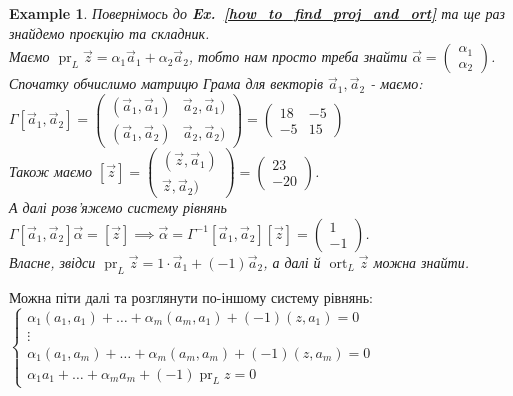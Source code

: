 \documentclass[a4paper, 10pt]{article}
\theoremstyle{theoremdd}
\newtheorem{example}[theorem]{Example}
\newcommand\exref[1]{\textbf{Ex.~\ref{#1}}}
\DeclareMathOperator{\ort}{ort}
\DeclareMathOperator{\pr}{pr}
\begin{document}
\begin{example}
Повернімось до \exref{how_to_find_proj_and_ort} та ще раз знайдемо проєкцію та складник.\\
Маємо $\pr_L \vec{z} = \alpha_1 \vec{a}_1 + \alpha_2 \vec{a}_2$, тобто нам просто треба знайти $\vec{\alpha} = \begin{pmatrix}
\alpha_1 \\ \alpha_2
\end{pmatrix}$.\\
Спочатку обчислимо матрицю Грама для векторів $\vec{a}_1,\vec{a}_2$ - маємо:\\
$\Gamma[\vec{a}_1,\vec{a}_2] = \begin{pmatrix}
(\vec{a}_1,\vec{a}_1) & \vec{a}_2, \vec{a}_1) \\
(\vec{a}_1,\vec{a}_2) & \vec{a}_2, \vec{a}_2) 
\end{pmatrix} = \begin{pmatrix}
18 & -5 \\
-5 & 15
\end{pmatrix}$\\
Також маємо $[\vec{z}] = \begin{pmatrix}
(\vec{z},\vec{a}_1) \\
\vec{z},\vec{a}_2)
\end{pmatrix} = \begin{pmatrix}
23 \\ -20
\end{pmatrix}$.\\
А далі розв'яжемо систему рівнянь $\Gamma[\vec{a}_1,\vec{a}_2] \vec{\alpha} = [\vec{z}] \implies \vec{\alpha} = \Gamma^{-1}[\vec{a}_1,\vec{a}_2] [\vec{z}] = \begin{pmatrix}
1 \\ -1
\end{pmatrix}$.\\
Власне, звідси $\pr_L \vec{z} = 1 \cdot \vec{a}_1 + (-1) \vec{a}_2$, а далі й $\ort_L \vec{z}$ можна знайти.
\end{example}
\noindent
Можна піти далі та розглянути по-іншому систему рівнянь:\\
$\begin{cases}
\alpha_1 (a_1,a_1) + \dots + \alpha_m (a_m,a_1) + (-1) (z,a_1) = 0 \\
\vdots \\
\alpha_1 (a_1,a_m) + \dots + \alpha_m (a_m,a_m) + (-1) (z,a_m) = 0 \\
\alpha_1 a_1 + \dots + \alpha_m a_m + (-1) \pr_L z = 0
\end{cases}$\\
\end{document}
